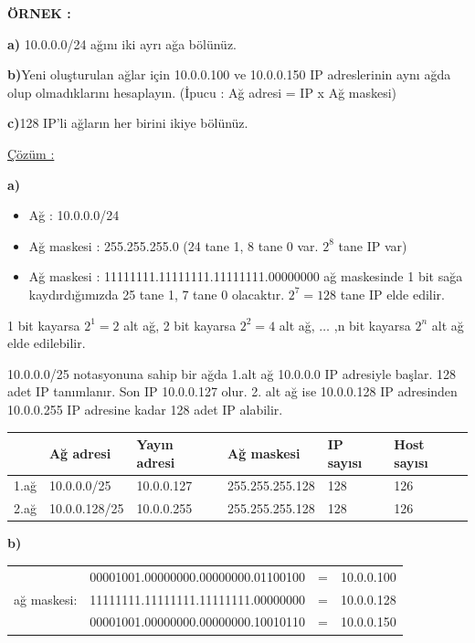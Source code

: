 \textbf{ÖRNEK : } 

\textbf{a)} 10.0.0.0/24 ağını iki ayrı ağa bölünüz.



\textbf{b)}Yeni oluşturulan ağlar için 10.0.0.100 ve 10.0.0.150 IP adreslerinin aynı ağda olup olmadıklarını hesaplayın. (İpucu : Ağ adresi = IP x Ağ maskesi)

\textbf{c)}128 IP'li ağların her birini ikiye bölünüz. 


\underline{Çözüm :}

\textbf{a)}
\begin{itemize}
\item[] Ağ : 10.0.0.0/24
\item[] Ağ maskesi : 255.255.255.0 (24 tane 1, 8 tane 0 var. $2^8$ tane IP var)
\item[] Ağ maskesi : 11111111.11111111.11111111.00000000 ağ maskesinde 1 bit sağa kaydırdığımızda 25 tane 1, 7 tane 0 olacaktır. $2^7=128$ tane IP elde edilir. 
\end{itemize} 

1 bit kayarsa $2^1=2$ alt ağ,
2 bit kayarsa $2^2=4$ alt ağ,
$\hdots$
,n bit kayarsa $2^n$ alt ağ elde edilebilir. 

10.0.0.0/25 notasyonuna sahip bir ağda 1.alt ağ 10.0.0.0 IP adresiyle başlar. 128 adet IP tanımlanır. Son IP 10.0.0.127 olur. 2. alt ağ ise 10.0.0.128 IP adresinden 10.0.0.255 IP adresine kadar 128 adet IP alabilir. 


\begin{tabular}{l|l|l|l|l|l}
&Ağ adresi & Yayın adresi & Ağ maskesi & IP sayısı & Host sayısı\\
\hline
1.ağ & 10.0.0.0/25 & 10.0.0.127 & 255.255.255.128 & 128 &126 \\
\hline
2.ağ & 10.0.0.128/25 & 10.0.0.255 &255.255.255.128 & 128 & 126 \\

\end{tabular}


\textbf{b)}

\begin{tabular}{llll}
& 00001001.00000000.00000000.01100100 &=& 10.0.0.100\\
ağ maskesi:& 11111111.11111111.11111111.00000000 &=&10.0.0.128\\
\hline
&00001001.00000000.00000000.10010110 &=&10.0.0.150 \\

\end{tabular}

